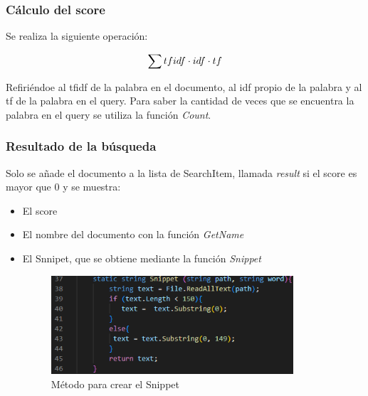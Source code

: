 \documentclass{beamer}
\begin{document}
        \begin{frame}
            \frametitle{Cálculo del score}

            Se realiza la siguiente operación:

\begin{equation}
    \centering
  \sum  tfidf \cdot  idf \cdot tf
\end{equation}

Refiriéndoe al tfidf de la palabra en el documento, al idf propio de la palabra y al tf de la palabra en el query. Para saber la cantidad de veces que se encuentra la palabra en el query se
utiliza la función \textit{Count}.
        
        \end{frame}

        \begin{frame}
            \frametitle{Resultado de la búsqueda}

            Solo se añade el documento a la lista de SearchItem, 
            llamada \textit{result} si el score es mayor  que 0 y se muestra:

        \begin{itemize}
            \item El score
            \item El nombre del documento con la función \textit{GetName} 
            \item El Snnipet, que se obtiene mediante la función \textit{Snippet}
            
            \begin{figure}[h!]

                \centering
                \label{imag: snippet}
                \includegraphics[width=9cm]{Snippet.png}
                \caption[]{ \footnotesize Método para crear el Snippet}
            
            \end{figure}
            
        \end{itemize}
        \end{frame}
\end{document}
